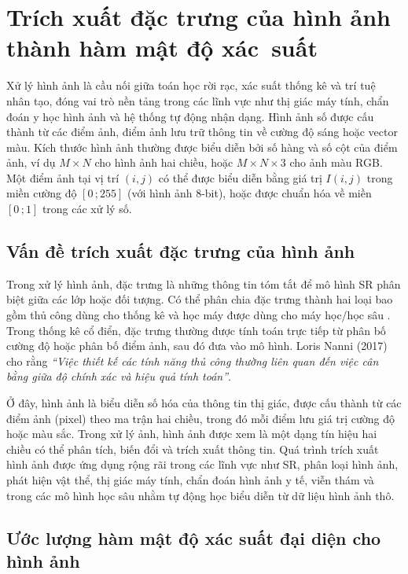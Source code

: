 \documentclass[a4paper,oneside]{book} %
\theoremstyle{plain}
\theoremstyle{plain}
\theoremstyle{nonumberplain}
\begin{document}
\section{Trích xuất đặc trưng của hình ảnh thành hàm mật độ xác~suất}

Xử lý hình ảnh là cầu nối giữa toán học rời rạc, xác suất thống kê và trí tuệ nhân tạo, đóng vai trò nền tảng trong các lĩnh vực như thị giác máy tính, chẩn đoán y học hình ảnh và hệ thống tự động nhận dạng. Hình ảnh số được cấu thành từ các điểm ảnh, điểm ảnh lưu trữ thông tin về cường độ sáng hoặc vector màu. Kích thước hình ảnh thường được biểu diễn bởi số hàng và số cột của điểm ảnh, ví dụ $M\times N$ cho hình ảnh hai chiều, hoặc $M\times N\times 3$ cho ảnh màu RGB. Một điểm ảnh tại vị trí $(i,j)$ có thể được biểu diễn bằng giá trị $I(i,j)$ trong miền cường độ $[0\,;255]$ (với hình ảnh 8-bit), hoặc được chuẩn hóa về miền $[0\,;1]$ trong các xử lý số. 

\subsection{Vấn đề trích xuất đặc trưng của hình ảnh}

Trong xử lý hình ảnh, đặc trưng là những thông tin tóm tắt để mô hình SR phân biệt giữa các lớp hoặc đối tượng. Có thể phân chia đặc trưng thành hai loại bao gồm thủ công dùng cho thống kê và học máy được dùng cho máy học/học sâu \cite{nanni2017handcrafted}. Trong thống kê cổ điển, đặc trưng thường được tính toán trực tiếp từ phân bố cường độ hoặc phân bố điểm ảnh, sau đó đưa vào mô hình. Loris Nanni (2017) \cite{nanni2017handcrafted} cho rằng \emph{``Việc thiết kế các tính năng thủ công thường liên quan đến việc cân bằng giữa độ chính xác và hiệu quả tính toán''}.

Ở đây, hình ảnh là biểu diễn số hóa của thông tin thị giác, được cấu thành từ các điểm ảnh (pixel) theo ma trận hai chiều, trong đó mỗi điểm lưu giá trị cường độ hoặc màu sắc. Trong xử lý ảnh, hình ảnh được xem là một dạng tín hiệu hai chiều có thể phân tích, biến đổi và trích xuất thông tin. Quá trình trích xuất hình ảnh được ứng dụng rộng rãi trong các lĩnh vực như SR, phân loại hình ảnh, phát hiện vật thể, thị giác máy tính, chẩn đoán hình ảnh y tế, viễn thám và trong các mô hình học sâu nhằm tự động học biểu diễn từ dữ liệu hình ảnh thô.



\subsection{Ước lượng hàm mật độ xác suất đại diện cho hình ảnh}
\end{document}
